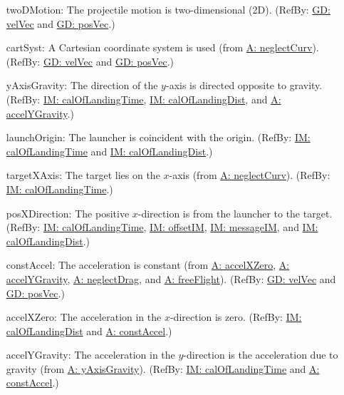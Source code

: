 \documentclass[12pt]{article}
\begin{document}
\begin{itemize}
\item[twoDMotion:\phantomsection\label{twoDMotion}]{The projectile motion is two-dimensional (2D). (RefBy: \hyperref[GD:velVec]{GD: velVec} and \hyperref[GD:posVec]{GD: posVec}.)}
\item[cartSyst:\phantomsection\label{cartSyst}]{A Cartesian coordinate system is used (from \hyperref[neglectCurv]{A: neglectCurv}). (RefBy: \hyperref[GD:velVec]{GD: velVec} and \hyperref[GD:posVec]{GD: posVec}.)}
\item[yAxisGravity:\phantomsection\label{yAxisGravity}]{The direction of the $y$-axis is directed opposite to gravity. (RefBy: \hyperref[IM:calOfLandingTime]{IM: calOfLandingTime}, \hyperref[IM:calOfLandingDist]{IM: calOfLandingDist}, and \hyperref[accelYGravity]{A: accelYGravity}.)}
\item[launchOrigin:\phantomsection\label{launchOrigin}]{The launcher is coincident with the origin. (RefBy: \hyperref[IM:calOfLandingTime]{IM: calOfLandingTime} and \hyperref[IM:calOfLandingDist]{IM: calOfLandingDist}.)}
\item[targetXAxis:\phantomsection\label{targetXAxis}]{The target lies on the $x$-axis (from \hyperref[neglectCurv]{A: neglectCurv}). (RefBy: \hyperref[IM:calOfLandingTime]{IM: calOfLandingTime}.)}
\item[posXDirection:\phantomsection\label{posXDirection}]{The positive $x$-direction is from the launcher to the target. (RefBy: \hyperref[IM:calOfLandingTime]{IM: calOfLandingTime}, \hyperref[IM:offsetIM]{IM: offsetIM}, \hyperref[IM:messageIM]{IM: messageIM}, and \hyperref[IM:calOfLandingDist]{IM: calOfLandingDist}.)}
\item[constAccel:\phantomsection\label{constAccel}]{The acceleration is constant (from \hyperref[accelXZero]{A: accelXZero}, \hyperref[accelYGravity]{A: accelYGravity}, \hyperref[neglectDrag]{A: neglectDrag}, and \hyperref[freeFlight]{A: freeFlight}). (RefBy: \hyperref[GD:velVec]{GD: velVec} and \hyperref[GD:posVec]{GD: posVec}.)}
\item[accelXZero:\phantomsection\label{accelXZero}]{The acceleration in the $x$-direction is zero. (RefBy: \hyperref[IM:calOfLandingDist]{IM: calOfLandingDist} and \hyperref[constAccel]{A: constAccel}.)}
\item[accelYGravity:\phantomsection\label{accelYGravity}]{The acceleration in the $y$-direction is the acceleration due to gravity (from \hyperref[yAxisGravity]{A: yAxisGravity}). (RefBy: \hyperref[IM:calOfLandingTime]{IM: calOfLandingTime} and \hyperref[constAccel]{A: constAccel}.)}

\end{itemize}
\end{document}
